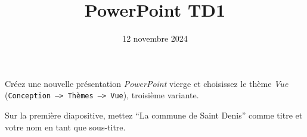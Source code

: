 
\usepackage[a4paper, margin=1in]{geometry}
\usepackage{hyperref}

\title{{\bf \large{PowerPoint TD1}}}
\author{}%
\date{\small 12 novembre 2024}
\maketitle

\begin{questions}



\medskip

\question Créez une nouvelle présentation \emph{PowerPoint} vierge et
choisissez le thème \emph{Vue} (\texttt{Conception --> Thèmes --> Vue}),
troisième variante.

\question Sur la première diapositive, mettez ``La commune de Saint Denis''
comme titre et votre nom en tant que sous-titre.


\end{questions}

